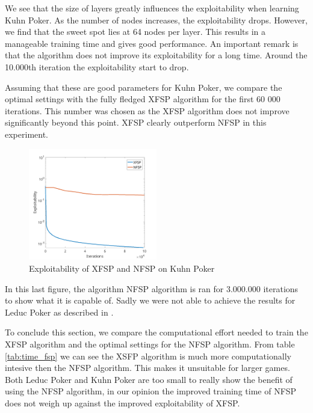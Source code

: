 \documentclass[10pt,a4paper]{article}
\begin{document}
We see that the size of layers greatly influences the exploitability when learning Kuhn Poker. As the number of nodes increases, the exploitability drops. However, we find that the sweet spot lies at 64 nodes per layer. This results in a manageable training time and gives good performance.
An important remark is that the algorithm does not improve its exploitability for a long time. Around the 10.000th iteration the exploitability start to drop. 

Assuming that these are good parameters for Kuhn Poker, we compare the optimal settings with the fully fledged XFSP algorithm for the first 60 000 iterations. This number was chosen as the XFSP algorithm does not improve significantly beyond this point. XFSP clearly outperform NFSP in this experiment.

\begin{figure}[h]
\centering
\label{fig:layers_kuhn}
\includegraphics[width=0.5\textwidth]{Figures/xfsp_nfsp_kuhn.png}
\caption{Exploitability of XFSP and NFSP on Kuhn Poker}
\end{figure}

In this last figure, the algorithm NFSP algorithm is ran for 3.000.000 iterations to show what it is capable of. Sadly we were not able to achieve the results for Leduc Poker as described in \cite{heinrichphd}.


To conclude this section, we compare the computational effort needed to train the XFSP algorithm and the optimal settings for the NFSP algorithm. From table \ref{tab:time_fsp} we can see the XSFP algorithm is much more computationally intesive then the NFSP algorithm. This makes it unsuitable for larger games. Both Leduc Poker and Kuhn Poker are too small to really show the benefit of using the NFSP algorithm, in our opinion the improved training time of NFSP does not weigh up against the improved exploitability of XFSP.
\end{document}
